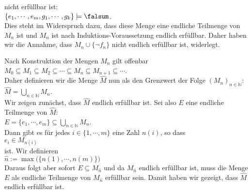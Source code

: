 \begin{enumerate}
\begin{enumerate}
        nicht erfüllbar ist:
        \\[0.2cm]
        \hspace*{1.3cm}
        $\{ e_1, \cdots, e_m, g_1, \cdots, g_k \} \models \falsum$.
        \\[0.2cm]
        Dies steht im Widerspruch dazu, dass diese Menge eine endliche Teilmenge von $M_n$ ist und
        $M_n$ ist nach Induktions-Voraussetzung endlich erfüllbar.  Daher haben wir die Annahme,
        dass $M_n \cup \{ \neg f_n \}$ nicht endlich erfüllbar ist, widerlegt. 
  \end{enumerate}
  Nach Konstruktion der Mengen $M_n$ gilt offenbar
  \\[0.2cm]
  \hspace*{1.3cm}
  $M_0 \subseteq M_1 \subseteq M_2 \subseteq \cdots \subseteq M_n \subseteq M_{n+1} \subseteq \cdots$.
  \\[0.2cm]
  Daher definieren wir die Menge $\widehat{M}$ nun als den Grenzwert der Folge $(M_n)_{n \in \mathbb{N}}$:
  \\[0.2cm]
  \hspace*{1.3cm}
  $\widehat{M} = \bigcup\limits_{n \in \mathbb{N}} M_n$.
  \\[0.2cm]
  Wir zeigen zunächst, dass $\widehat{M}$ endlich erfüllbar ist.  Sei also $E$ eine endliche
  Teilmenge von $\widehat{M}$:
  \\[0.2cm]
  \hspace*{1.3cm}
  $E = \{ e_1, \cdots, e_m \} \subseteq \bigcup\limits_{n \in \mathbb{N}} M_n$.
  \\[0.2cm]
  Dann gibt es für jedes $i \in \{ 1, \cdots, m \}$ eine Zahl $n(i)$, so dass
  \\[0.2cm]
  \hspace*{1.3cm}
  $e_i \in M_{n(i)}$ 
  \\[0.2cm]
  ist.  Wir definieren
  \\[0.2cm]
  \hspace*{1.3cm}
  $\widehat{n} := \max\bigl(\bigl\{n(1), \cdots, n(m) \bigr\}\bigr)$
  \\[0.2cm]
  Daraus folgt aber sofort $E \subseteq M_{\widehat{n}}$ und da $M_{\widehat{n}}$ endlich erfüllbar
  ist, muss die Menge $E$ als endliche Teilmenge von $M_{\widehat{n}}$ erfüllbar sein.
  Damit haben wir gezeigt, dass $\widehat{M}$ endlich erfüllbar ist.


\end{enumerate}
